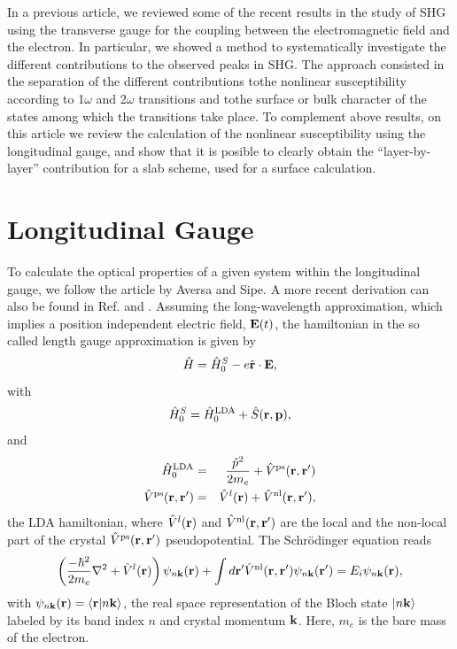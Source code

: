 \documentclass[floatfix,prb,aps,superscriptaddress,11pt,preprint]{revtex4}
\begin{document}
In a previous article,\cite{mendoza_epioptics_2001} we reviewed some of the recent results in the study of SHG using the transverse gauge for the coupling between the electromagnetic field and the electron. In particular, we
showed a method to systematically investigate the different contributions to the observed peaks in SHG.\cite{arzate_microscopic_2001} The approach consisted in the separation of the different contributions tothe nonlinear susceptibility according to 1$\omega$ and 2$\omega$ transitions and tothe  surface or bulk character of the states among which the transitions take place. To complement above results, on this article we review the calculation of the nonlinear susceptibility using the longitudinal gauge, and show that it is posible to clearly obtain the ``layer-by-layer'' contribution for a slab scheme, used for a surface calculation.

\section{Longitudinal Gauge}\label{longi}

To calculate the optical properties of a given system
within the longitudinal gauge, we follow the article by
Aversa and Sipe.\cite{aversa_nonlinear_1995} A more recent derivation can also be
found in
Ref. \cite{sipe_second-order_2000} and \cite{lambrecht_band_2000}.
 Assuming the long-wavelength approximation,
which implies a position independent electric field, 
$\mathbf{E}(t)$,  
the hamiltonian in the so called length gauge approximation
is given by
\begin{equation}\label{ache}
\hat{H}=\hat{H}^S_0-e \hat{\mathbf{r}} \cdot \mathbf{E},
\end{equation}
with
\begin{eqnarray}\label{ache.1}
\hat H^S_0=\hat H^{\mathrm{LDA}}_0
 + \hat S(\mathbf{r},\mathbf{p})
,
\end{eqnarray} 
and
\begin{eqnarray}\label{ache.2}
\hat H^{\mathrm{LDA}}_0&=&\frac{\hat p^2}{2m_e}  + \hat V^{\mathrm{ps}}(\mathbf{r},\mathbf{r}')
\nonumber\\
\hat V^{\mathrm{ps}}(\mathbf{r},\mathbf{r}')
&=&\hat V^l(\mathbf{r}) + \hat V^{\mathrm{nl}}(\mathbf{r},\mathbf{r}')
,
\end{eqnarray}  
the LDA hamiltonian, 
where $\hat V^l(\mathbf{r})$ and $\hat V^{\mathrm{nl}}(\mathbf{r},\mathbf{r}')$ are the local and
the non-local part of the  
crystal $\hat V^{\mathrm{ps}}(\mathbf{r},\mathbf{r}')$ pseudopotential.
The Schr\"odinger equation reads
\begin{eqnarray}\label{ache.4}
\left(
\frac{-\hbar^2}{2m_e}\nabla^2
 + \hat V^l(\mathbf{r})\right)\psi_{n\mathbf{k}}(\mathbf{r})
 + \int d\mathbf{r}'\hat V^{\mathrm{nl}}(\mathbf{r},\mathbf{r}')\psi_{n\mathbf{k}}(\mathbf{r}')
=E_i\psi_{n\mathbf{k}}(\mathbf{r})
,
\end{eqnarray} 
with $\psi_{n\mathbf{k}}(\mathbf{r})=\langle {\mathbf{r}} | {n\mathbf{k}} \rangle$, the real space
representation of the Bloch state $| n\mathbf{k} \rangle$
labeled
by  its
band index $n$ and crystal momentum $\mathbf{k}$. 
Here, $m_e$ is the 
bare mass of the 
electron.
\end{document}
